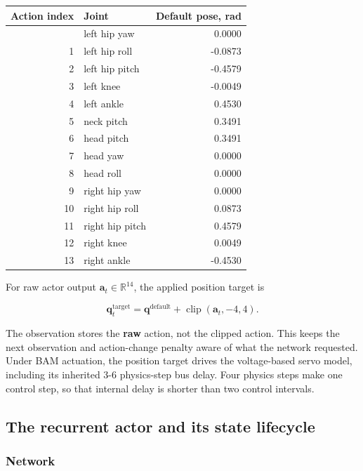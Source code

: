 \documentclass[
  american,
  11pt,
  letterpaper,
]{article}
\newcounter{none} %
\begin{document}
{\def\LTcaptype{none} %
\begin{longtable}[]{@{}rlr@{}}
\toprule\noalign{}
Action index & Joint & Default pose, rad \\
\midrule\noalign{}
\endhead
\bottomrule\noalign{}
\endlastfoot
0 & left hip yaw & 0.0000 \\
1 & left hip roll & -0.0873 \\
2 & left hip pitch & -0.4579 \\
3 & left knee & -0.0049 \\
4 & left ankle & 0.4530 \\
5 & neck pitch & 0.3491 \\
6 & head pitch & 0.3491 \\
7 & head yaw & 0.0000 \\
8 & head roll & 0.0000 \\
9 & right hip yaw & 0.0000 \\
10 & right hip roll & 0.0873 \\
11 & right hip pitch & 0.4579 \\
12 & right knee & 0.0049 \\
13 & right ankle & -0.4530 \\
\end{longtable}
}

For raw actor output \(\mathbf a_t\in\mathbb R^{14}\), the applied
position target is

\[
\mathbf q^{\text{target}}_t
=\mathbf q^{\text{default}}
+\operatorname{clip}(\mathbf a_t,-4,4).
\]

The observation stores the \textbf{raw} action, not the clipped action.
This keeps the next observation and action-change penalty aware of what
the network requested. Under BAM actuation, the position target drives
the voltage-based servo model, including its inherited 3-6 physics-step
bus delay. Four physics steps make one control step, so that internal
delay is shorter than two control intervals.

\subsection{The recurrent actor and its state
lifecycle}\label{the-recurrent-actor-and-its-state-lifecycle}

\subsubsection{Network}\label{network}
\end{document}
